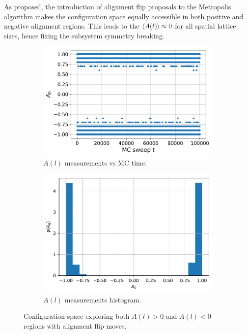 \documentclass[../thesis_main.tex]{subfiles}
\begin{document}
As proposed, the introduction of alignment flip proposals to the Metropolis algorithm makes the configuration space equally accessible in both positive and negative alignment regions. This leads to the $\expval{A(l)} \approx 0$ for all spatial lattice sizes, hence fixing the subsystem symmetry breaking. 
\begin{figure}[t!]
    \centering
    \begin{subfigure}[b]{0.5\textwidth}
        \centering
        \includegraphics[width=\textwidth]{images/fix_subsystem_symmetry/measurement A(l) vs MC time (l=0).png}
        \caption{ $A(l)$ measurements vs MC time.}
    \end{subfigure}
    \begin{subfigure}[b]{0.48\textwidth}
        \centering
        \includegraphics[width=\textwidth]{images/fix_subsystem_symmetry/measurement A(l) histogram (l=0).pdf}
        \caption{ $A(l)$ measurements histogram.}
    \end{subfigure}
    \caption{Configuration space exploring both $A(l)>0$ and $A(l)<0$ regions with alignment flip moves.}
    \label{alignflipmeasurements}
\end{figure}
\end{document}
